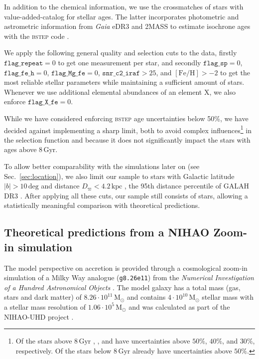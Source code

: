 \documentclass[fleqn,usenatbib]{mnras}
\newcommand{\Gaia}{\textit{Gaia}\xspace} %
\begin{document}
In addition to the chemical information, we use the crossmatches of stars with value-added-catalog for stellar ages. The latter incorporates photometric and astrometric information from \Gaia eDR3 \citep{Lindegren2021a} and 2MASS \citep{Skrutskie2006} to estimate isochrone ages with the \textsc{bstep} code \citep{Sharma2018}.

We apply the following general quality and selection cuts to the data, firstly $\texttt{flag\_repeat} = 0$ to get one measurement per star, and secondly $\texttt{flag\_sp} = 0$, $\texttt{flag\_fe\_h} = 0$, $\texttt{flag\_Mg\_fe} = 0$, $\texttt{snr\_c2\_iraf} > 25$, and $\mathrm{[Fe/H]} > -2$ to get the most reliable stellar parameters while maintaining a sufficient amount of stars. Whenever we use additional elemental abundances of an element X, we also enforce $\texttt{flag\_X\_fe} = 0$.

While we have considered enforcing \textsc{bstep} age uncertainties below 50\%, we have decided against implementing a sharp limit, both to avoid complex influences\footnote{Of the  stars above $8\,\mathrm{Gyr}$ , , and  have uncertainties above $50\%$, $40\%$, and $30\%$, respectively. Of the  stars below $8\,\mathrm{Gyr}$ already  have uncertainties above $50\%$.} in the selection function and because it does not significantly impact the stars with ages above $8\,\mathrm{Gyr}$.

To allow better comparability with the simulations later on (see Sec.~\ref{sec:location}), we also limit our sample to stars with Galactic latitude $\vert b \vert > 10\,\mathrm{deg}$ and distance $D_\varpi < 4.2\,\mathrm{kpc}$ \citep[based on photogeometric distances from][]{BailerJones2021}, the 95th distance percentile of GALAH DR3 \citep{Buder2021}. After applying all these cuts, our sample still consists of stars, allowing a statistically meaningful comparison with theoretical predictions.

\subsection{Theoretical predictions from a NIHAO Zoom-in simulation}\label{sec:sim_data}

The model perspective on accretion is provided through a cosmological zoom-in simulation of a Milky Way analogue (\texttt{g8.26e11}) from the \textit{Numerical Investigation of a Hundred Astronomical Objects} \citep[NIHAO,][]{Wang2015}. The model galaxy has a total mass (gas, stars and dark matter) of $8.26 \cdot 10^{11}\,\mathrm{M_\odot}$ and contains $4 \cdot 10^{10}\,\mathrm{M_\odot}$ stellar mass with a stellar mass resolution of $1.06 \cdot 10^{5}\,\mathrm{M_\odot}$ \citep{Buck2021} and was calculated as part of the NIHAO-UHD project \citep{Buck2020b}.
\end{document}
